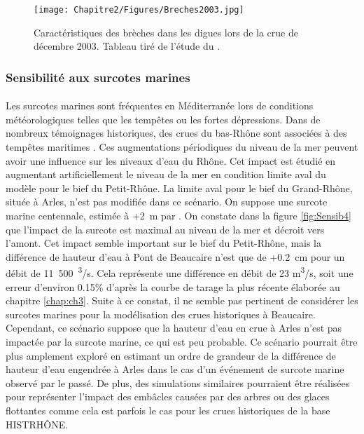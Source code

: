 	\begin{figure}[h]
		\centering
		\texttt{[image: Chapitre2/Figures/Breches2003.jpg]}
        \caption{Caractéristiques des brèches dans les digues lors de la crue de décembre 2003. Tableau tiré de l'étude du \citet{symadrem_programme_2012}.}
		\label{fig:Breches2003}
	\end{figure}		

\FloatBarrier	
	
	\subsubsection{Sensibilité aux surcotes marines}	
	
	\paragraph{} Les surcotes marines sont fréquentes en Méditerranée lors de conditions météorologiques telles que les tempêtes ou les fortes dépressions. Dans de nombreux témoignages historiques, des crues du bas-Rhône sont associées à des tempêtes maritimes \citep{pichard_sept_2014}. Ces augmentations périodiques du niveau de la mer peuvent avoir une influence sur les niveaux d'eau du Rhône. Cet impact est étudié en augmentant artificiellement le niveau de la mer en condition limite aval du modèle pour le bief du Petit-Rhône. La limite aval pour le bief du Grand-Rhône, située à Arles, n'est pas modifiée dans ce scénario. On suppose une surcote marine centennale, estimée à +2~m par \citet{kergadallan_estimation_2015}. On constate dans la figure \ref{fig:Sensib4} que l'impact de la surcote est maximal au niveau de la mer et décroit vers l'amont. Cet impact semble important sur le bief du Petit-Rhône, mais la différence de hauteur d'eau à Pont de Beaucaire n'est que de +0.2~cm pour un débit de 11~500~\textsuperscript{3}/s. Cela représente une différence en débit de 23 m\textsuperscript{3}/s, soit une erreur d'environ 0.15\% d'après la courbe de tarage la plus récente élaborée au chapitre \ref{chap:ch3}. Suite à ce constat, il ne semble pas pertinent de considérer les surcotes marines pour la modélisation des crues historiques à Beaucaire. Cependant, ce scénario suppose que la hauteur d'eau en crue à Arles n'est pas impactée par la surcote marine, ce qui est peu probable. Ce scénario pourrait être plus amplement exploré en estimant un ordre de grandeur de la différence de hauteur d'eau engendrée à Arles dans le cas d'un événement de surcote marine observé par le passé. De plus, des simulations similaires pourraient être réalisées pour représenter l'impact des embâcles causées par des arbres ou des glaces flottantes comme cela est parfois le cas pour les crues historiques de la base HISTRHÔNE.
	\FloatBarrier
